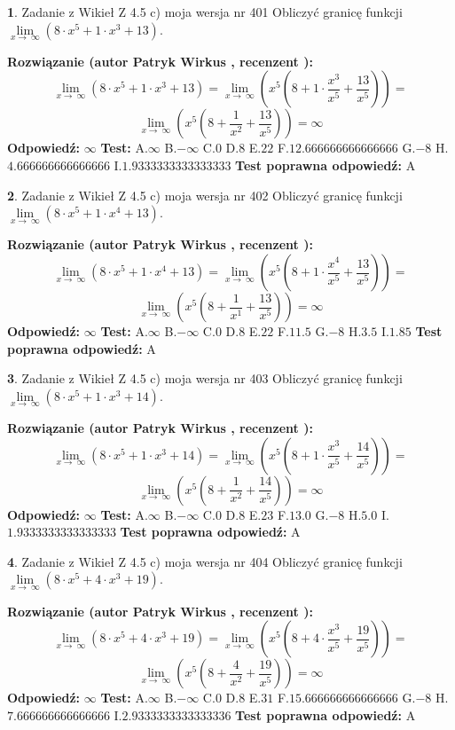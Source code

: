 \documentclass[12pt, a4paper]{article}
\theoremstyle{definition} %
\newtheorem{zad}{}
\newcommand{\zadStart}[1]{\begin{zad}#1\newline}
\newcommand{\zadStop}{\end{zad}}
\newcommand{\rozwStart}[2]{\noindent \textbf{Rozwiązanie (autor #1 , recenzent #2): }\newline}
\newcommand{\rozwStop}{\newline}
\newcommand{\odpStart}{\noindent \textbf{Odpowiedź:}\newline}
\newcommand{\odpStop}{\newline}
\newcommand{\testStart}{\noindent \textbf{Test:}\newline}
\newcommand{\testStop}{\newline}
\newcommand{\kluczStart}{\noindent \textbf{Test poprawna odpowiedź:}\newline}
\newcommand{\kluczStop}{\newline}
\begin{document}
\zadStart{Zadanie z Wikieł Z 4.5 c) moja wersja nr 401}
Obliczyć granicę funkcji  $\lim\limits_{x\to\ \infty}(8 \cdot x^{5}+1 \cdot x^{3}+13)$.
\zadStop
\rozwStart{Patryk Wirkus}{}
$$\lim\limits_{x\to\ \infty}(8 \cdot x^{5}+1 \cdot x^{3}+13) = \lim\limits_{x\to\ \infty}(x^{5}(8 +1 \cdot \frac{x^{3}}{x^{5}}+\frac{13}{x^{5}})) =$$ $$\lim\limits_{x\to\ \infty}(x^{5}(8 +\frac{1}{x^{2}}+\frac{13}{x^{5}})) =\infty$$
\rozwStop
\odpStart
$\infty$
\odpStop
\testStart
A.$\infty$ B.$-\infty$ C.$0$ D.$8$ E.$22$
F.$12.666666666666666$ G.$-8$
H.$4.666666666666666$
I.$1.9333333333333333$
\testStop
\kluczStart
A
\kluczStop



\zadStart{Zadanie z Wikieł Z 4.5 c) moja wersja nr 402}
Obliczyć granicę funkcji  $\lim\limits_{x\to\ \infty}(8 \cdot x^{5}+1 \cdot x^{4}+13)$.
\zadStop
\rozwStart{Patryk Wirkus}{}
$$\lim\limits_{x\to\ \infty}(8 \cdot x^{5}+1 \cdot x^{4}+13) = \lim\limits_{x\to\ \infty}(x^{5}(8 +1 \cdot \frac{x^{4}}{x^{5}}+\frac{13}{x^{5}})) =$$ $$\lim\limits_{x\to\ \infty}(x^{5}(8 +\frac{1}{x^{1}}+\frac{13}{x^{5}})) =\infty$$
\rozwStop
\odpStart
$\infty$
\odpStop
\testStart
A.$\infty$ B.$-\infty$ C.$0$ D.$8$ E.$22$
F.$11.5$ G.$-8$
H.$3.5$
I.$1.85$
\testStop
\kluczStart
A
\kluczStop



\zadStart{Zadanie z Wikieł Z 4.5 c) moja wersja nr 403}
Obliczyć granicę funkcji  $\lim\limits_{x\to\ \infty}(8 \cdot x^{5}+1 \cdot x^{3}+14)$.
\zadStop
\rozwStart{Patryk Wirkus}{}
$$\lim\limits_{x\to\ \infty}(8 \cdot x^{5}+1 \cdot x^{3}+14) = \lim\limits_{x\to\ \infty}(x^{5}(8 +1 \cdot \frac{x^{3}}{x^{5}}+\frac{14}{x^{5}})) =$$ $$\lim\limits_{x\to\ \infty}(x^{5}(8 +\frac{1}{x^{2}}+\frac{14}{x^{5}})) =\infty$$
\rozwStop
\odpStart
$\infty$
\odpStop
\testStart
A.$\infty$ B.$-\infty$ C.$0$ D.$8$ E.$23$
F.$13.0$ G.$-8$
H.$5.0$
I.$1.9333333333333333$
\testStop
\kluczStart
A
\kluczStop



\zadStart{Zadanie z Wikieł Z 4.5 c) moja wersja nr 404}
Obliczyć granicę funkcji  $\lim\limits_{x\to\ \infty}(8 \cdot x^{5}+4 \cdot x^{3}+19)$.
\zadStop
\rozwStart{Patryk Wirkus}{}
$$\lim\limits_{x\to\ \infty}(8 \cdot x^{5}+4 \cdot x^{3}+19) = \lim\limits_{x\to\ \infty}(x^{5}(8 +4 \cdot \frac{x^{3}}{x^{5}}+\frac{19}{x^{5}})) =$$ $$\lim\limits_{x\to\ \infty}(x^{5}(8 +\frac{4}{x^{2}}+\frac{19}{x^{5}})) =\infty$$
\rozwStop
\odpStart
$\infty$
\odpStop
\testStart
A.$\infty$ B.$-\infty$ C.$0$ D.$8$ E.$31$
F.$15.666666666666666$ G.$-8$
H.$7.666666666666666$
I.$2.9333333333333336$
\testStop
\kluczStart
A
\kluczStop
\end{document}
